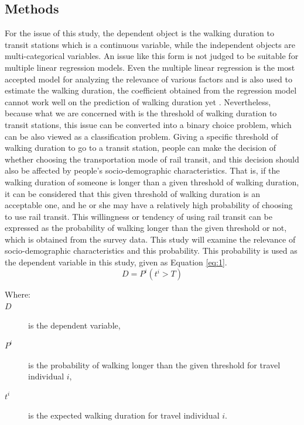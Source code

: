 \documentclass[Journal,letterpaper]{ascelike-new}
\begin{document}
\subsection{Methods}
For the issue of this study, the dependent object is the walking duration to transit stations which is a continuous variable, while the independent objects are multi-categorical variables. An issue like this form is not judged to be suitable for multiple linear regression models. Even the multiple linear regression is the most accepted model for analyzing the relevance of various factors and is also used to estimate the walking duration, the coefficient obtained from the regression model cannot work well on the prediction of walking duration yet \cite{Krygsman2004}. Nevertheless, because what we are concerned with is the threshold of walking duration to transit stations, this issue can be converted into a binary choice problem, which can be also viewed as a classification problem. Giving a specific threshold of walking duration to go to a transit station, people can make the decision of whether choosing the transportation mode of rail transit, and this decision should also be affected by people’s socio-demographic characteristics. That is, if the walking duration of someone is longer than a given threshold of walking duration, it can be considered that this given threshold of walking duration is an acceptable one, and he or she may have a relatively high probability of choosing to use rail transit. This willingness or tendency of using rail transit can be expressed as the probability of walking longer than the given threshold or not, which is obtained from the survey data. This study will examine the relevance of socio-demographic characteristics and this probability. This probability is used as the dependent variable in this study, given as Equation \ref{eq:1}.
%
\begin{equation}
D=P^i(t^i>T)
\label{eq:1}
\end{equation}
%
\begin{description}
\item[Where:]
\item[$D$] is the dependent variable,
\item[$P^i$] is the probability of walking longer than the given threshold for travel individual $i$,
\item[$t^i$] is the expected walking duration for travel individual $i$.
\end{description}
%
\end{document}
